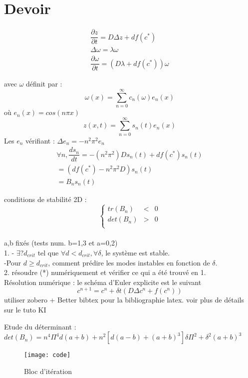 \documentclass[12pt,a4paper]{article}
\begin{document}
\section{Devoir}
\begin{align*}
\dfrac{\partial z}{\partial t}= D \Delta z + df(c^*) \\
\Delta \omega=\lambda \omega \\
\dfrac{\partial \omega}{\partial t}= (D \lambda + df(c^*))\omega
\end{align*}

avec $\omega$ définit par : 
\begin{equation}
\omega (x) = \sum_{n=0}^{\infty} c_{n}(\omega)e_{n}(x)
\end{equation}
où $e_{n}(x)=cos(n \pi x)$
\begin{equation}
z(x,t)= \sum_{n=0}^{\infty} s_{n}(t) e_{n}(x)
\end{equation}
Les $e_n$ vérifiant : $\Delta e_n = -n^2 \pi ^2 e_n$
\begin{align*}
\forall n, \dfrac{d s_n}{dt}= -(n^2 \pi^2) D s_n (t) + df(c^*)s_n (t) \\
=(df(c^*) - n^2 \pi ^2 D)s_n (t)\\
=B_n s_n (t)
\end{align*}

conditions de stabilité 2D : 
\[\left
\{\begin{array}{rcr}tr(B_n) & < & 0 \\
det(B_n) & > & 0 \\
\end{array}
\right.\]\\



a,b fixés (tests num. b=1,3 et a=0,2)\\

1.  - $\exists ? d_{crit}$ tel que $\forall d<d_{crit}, \forall\delta$, le système est stable.\\
-Pour $d \geq  d_{crit}$, comment prédire les modes instables en fonction de $\delta$.\\

2. résoudre (*) numériquement et vérifier ce qui a été trouvé en 1.\\


Résolution numérique : le schéma d'Euler explicite est le suivant
\begin{equation}
c^{n+1}=c^n+ \delta t ( D \Delta c^n + f(c^n))
\end{equation}
utiliser zobero + Better bibtex pour la bibliographie latex. voir plus de détails sur le tuto KI


Etude du d\'eterminant :\\
$det(B_n) = n^4 \Pi^4 d (a+b) +n^2 [d(a-b)+(a+b)^3]\delta \Pi^2+\delta^2(a+b)^3$



\begin{figure}[h]
\centering
\texttt{[image: code]}
\caption{Bloc d'itération 
         \label{fig:exemple}}
\end{figure}
\end{document}
